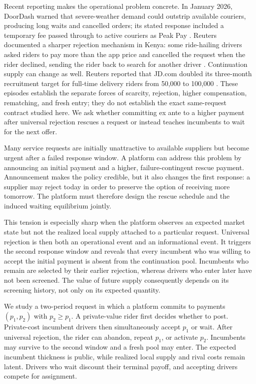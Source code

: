 \documentclass[mnsc,blindrev]{informs3}
\begin{document}
Recent reporting makes the operational problem concrete.  In January 2026,
DoorDash warned that severe-weather demand could outstrip available couriers,
producing long waits and cancelled orders; its stated response included a
temporary fee passed through to active couriers as Peak Pay
\citep{DoorDash2026}.  Reuters documented a sharper rejection mechanism in
Kenya: some ride-hailing drivers asked riders to pay more than the app price
and cancelled the request when the rider declined, sending the rider back to
search for another driver \citep{Okoth2024}.  Continuation supply can change
as well.  Reuters reported that JD.com doubled its three-month recruitment
target for full-time delivery riders from 50,000 to 100,000
\citep{Reuters2025JD}.  These episodes establish the separate forces of
scarcity, rejection, higher compensation, rematching, and fresh entry; they do
not establish the exact same-request contract studied here.  We ask whether
committing ex ante to a higher payment after universal rejection rescues a
request or instead teaches incumbents to wait for the next offer.

Many service requests are initially unattractive to available suppliers but
become urgent after a failed response window.  A platform can address this
problem by announcing an initial payment and a higher, failure-contingent
rescue payment.  Announcement makes the policy credible, but it also changes
the first response: a supplier may reject today in order to preserve the
option of receiving more tomorrow.  The platform must therefore design the
rescue schedule and the induced waiting equilibrium jointly.

This tension is especially sharp when the platform observes an expected
market state but not the realized local supply attached to a particular
request.  Universal rejection is then both an operational event and an
informational event.  It triggers the second response window and reveals that
every incumbent who was willing to accept the initial payment is absent from
the continuation pool.  Incumbents who remain are selected by their earlier
rejection, whereas drivers who enter later have not been screened.  The value
of future supply consequently depends on its screening history, not only on
its expected quantity.

We study a two-period request in which a platform commits to payments
$(p_1,p_2)$ with $p_2\ge p_1$.  A private-value rider first decides whether to
post.  Private-cost incumbent drivers then simultaneously accept $p_1$ or
wait.  After universal rejection, the rider can abandon, repeat $p_1$, or
activate $p_2$.  Incumbents may survive to the second window and a fresh pool
may enter.  The expected incumbent thickness is public, while realized local
supply and rival costs remain latent.  Drivers who wait discount their
terminal payoff, and accepting drivers compete for assignment.
\end{document}
